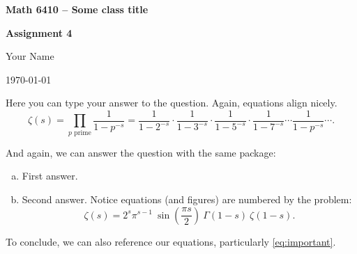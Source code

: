 \documentclass[10pt,twoside,fleqn]{article}
\begin{document}

\begin{center}
\centerline{\textbf{\Large Math 6410 -- Some class title}}
\centerline{\textbf{\large Assignment 4}}
\medskip
\centerline{Your Name} 
\medskip
\centerline{\today}
\end{center}

\thispagestyle{empty} %

\begin{flushleft} %

Here you can type your answer to the question. Again, equations align nicely. 
\begin{equation*}
\zeta(s) = \prod_{p \text{ prime}} \frac{1}{1-p^{-s}}= \frac{1}{1-2^{-s}}\cdot\frac{1}{1-3^{-s}}\cdot\frac{1}{1-5^{-s}}\cdot\frac{1}{1-7^{-s}} \cdots \frac{1}{1-p^{-s}} \cdots.
\end{equation*}

And again, we can answer the question with the same package:
\begin{enumerate}[(a)]
\item First answer.
\item Second answer. Notice equations (and figures) are numbered by the problem: 
\begin{equation}
\zeta(s) = 2^s\pi^{s-1}\ \sin\left(\frac{\pi s}{2}\right)\ \Gamma(1-s)\ \zeta(1-s). \label{eq:important}
\end{equation} 
\end{enumerate}
To conclude, we can also reference our equations, particularly \eqref{eq:important}.
\end{flushleft}
\end{document}
